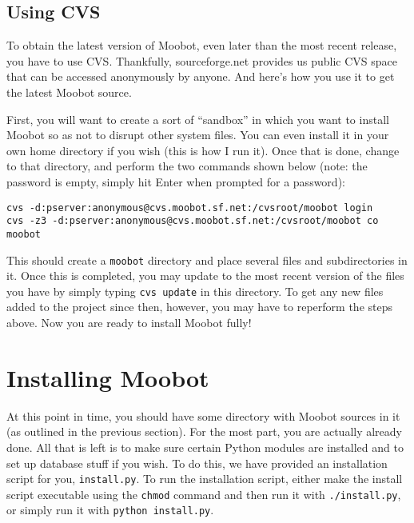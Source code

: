 \documentclass{article}
\begin{document}
\subsection{Using CVS}
To obtain the latest version of Moobot, even later than the most recent
release, you have to use CVS.  Thankfully, sourceforge.net provides us public
CVS space that can be accessed anonymously by anyone.  And here's how you use
it to get the latest Moobot source.

First, you will want to create a sort of ``sandbox'' in which you want to
install Moobot so as not to disrupt other system files.  You can even install
it in your own home directory if you wish (this is how I run it).  Once that
is done, change to that directory, and perform the two commands shown below
(note: the password is empty, simply hit Enter when prompted for a password):

\begin{verbatim}
cvs -d:pserver:anonymous@cvs.moobot.sf.net:/cvsroot/moobot login
cvs -z3 -d:pserver:anonymous@cvs.moobot.sf.net:/cvsroot/moobot co moobot
\end{verbatim}

This should create a \texttt{moobot} directory and place several files and
subdirectories in it.  Once this is completed, you may update to the most
recent version of the files you have by simply typing \texttt{cvs update} in
this directory.  To get any new files added to the project since then,
however, you may have to reperform the steps above.  Now you are ready to
install Moobot fully!

\section{Installing Moobot}
At this point in time, you should have some directory with Moobot sources in
it (as outlined in the previous section).  For the most part, you are actually
already done.  All that is left is to make sure certain Python modules are
installed and to set up database stuff if you wish.  To do this, we have
provided an installation script for you, \texttt{install.py}.  To run the
installation script, either make the install script executable using the
\texttt{chmod} command and then run it with \texttt{./install.py}, or simply
run it with \texttt{python install.py}.
\end{document}
